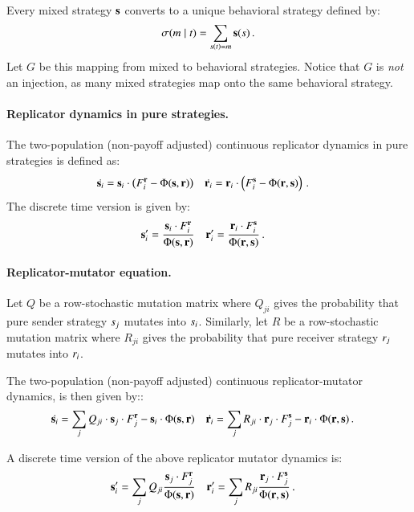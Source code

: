 Every mixed strategy $\mathrm{\mathbf{s}}$ converts to a unique behavioral
strategy defined by:
\begin{align*}
  \sigma(m \mid t) = \sum_{s(t) = m} \mathrm{\mathbf{s}}(s)\,.
\end{align*} 
Let $G$ be this mapping from mixed to behavioral strategies. Notice
that $G$ is \emph{not} an injection, as many mixed strategies map onto
the same behavioral strategy. 



\paragraph{Replicator dynamics in pure strategies.} The two-population
(non-payoff adjusted) continuous replicator dynamics in pure
strategies is defined as:
\begin{align*}
  \dot{\mathrm{\mathbf{s}}_i} & = \mathrm{\mathbf{s}}_i \cdot \left ( F_i^{\mathrm{\mathbf{r}}} -
  \Phi(\mathrm{\mathbf{s}},\mathrm{\mathbf{r}}) \right ) &   \dot{\mathrm{\mathbf{r}}_i} &  = \mathrm{\mathbf{r}}_i \cdot \left ( F_i^{\mathrm{\mathbf{s}}} -
  \Phi(\mathrm{\mathbf{r}},\mathrm{\mathbf{s}}) \right ) \,.
\end{align*}
The discrete time version is given by: 
\begin{align*}
  \mathrm{\mathbf{s}}_i' & = \frac{\mathrm{\mathbf{s}}_i \cdot
  F_i^{\mathrm{\mathbf{r}}}}{ \Phi(\mathrm{\mathbf{s}},\mathrm{\mathbf{r}})} &     \mathrm{\mathbf{r}}_i' & = \frac{\mathrm{\mathbf{r}}_i \cdot
  F_i^{\mathrm{\mathbf{s}}}}{ \Phi(\mathrm{\mathbf{r}},\mathrm{\mathbf{s}})} \,.
\end{align*}


\paragraph{Replicator-mutator equation.} Let $Q$ be a row-stochastic
mutation matrix where $Q_{ji}$ gives the probability that pure sender
strategy $s_j$ mutates into $s_i$. Similarly, let $R$ be a
row-stochastic mutation matrix where $R_{ji}$ gives the probability
that pure receiver strategy $r_j$ mutates into $r_i$.

The two-population (non-payoff adjusted) continuous replicator-mutator
dynamics, is then given by::
\begin{align*}
  \dot{\mathrm{\mathbf{s}}_i} & = \sum_{j}  Q_{ji} \cdot \mathrm{\mathbf{s}}_j
    \cdot F_j^{\mathrm{\mathbf{r}}} - \mathrm{\mathbf{s}}_i \cdot \Phi(\mathrm{\mathbf{s}},\mathrm{\mathbf{r}}) &
    \dot{\mathrm{\mathbf{r}}_i} & = \sum_{j}  R_{ji} \cdot \mathrm{\mathbf{r}}_j
    \cdot F_j^{\mathrm{\mathbf{s}}} - \mathrm{\mathbf{r}}_i \cdot \Phi(\mathrm{\mathbf{r}},\mathrm{\mathbf{s}}) \,.
\end{align*}
\begin{claim} A discrete time version of the above replicator mutator
  dynamics is:
  \begin{align*}
    \mathrm{\mathbf{s}}_i' & = \sum_{j} Q_{ji} \frac{\mathrm{\mathbf{s}}_j \cdot
      F_j^{\mathrm{\mathbf{r}}}}{ \Phi(\mathrm{\mathbf{s}},\mathrm{\mathbf{r}})} & \mathrm{\mathbf{r}}_i' & = \sum_{j}
    R_{ji} \frac{\mathrm{\mathbf{r}}_j \cdot F_j^{\mathrm{\mathbf{s}}}}{
      \Phi(\mathrm{\mathbf{r}},\mathrm{\mathbf{s}})}\,.
  \end{align*}
\end{claim}


